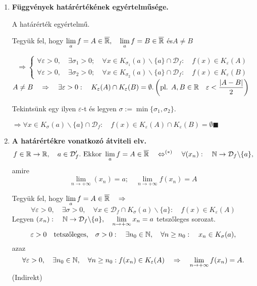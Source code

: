 \documentclass[a4paper,11.5pt]{article}
\begin{document}
\begin{enumerate}
		\item \textbf{Függvények határértékének egyértelműsége.}
		
		A határérték egyértelmű.
		
		\biz Tegyük fel, hogy $\displaystyle\lim_af=A\in\overline{\mathbb{R}}, \quad \lim_af=B\in \overline{\mathbb{R}}$ \quad és\quad  $A\not=B$
		
		\[\Rightarrow\left\{\begin{gathered}
		\forall \varepsilon>0, \quad \exists\sigma_1>0; \quad \forall x \in K_{\sigma_1}(a)\backslash\{a\}\cap \mathcal{D}_f:\quad f(x)\in K_{\varepsilon}(A)\\
		\forall \varepsilon>0, \quad \exists\sigma_2>0; \quad \forall x \in K_{\sigma_2}(a)\backslash\{a\}\cap \mathcal{D}_f:\quad f(x)\in K_{\varepsilon}(B)
		\end{gathered}\right.
		\]
		$\displaystyle A\not=B\quad \Rightarrow\quad \exists\varepsilon>0:\quad K_\varepsilon(A)\cap K_\varepsilon(B)=\emptyset. \left(\text{pl. }A,B \in \mathbb{R} \quad \varepsilon<\displaystyle\frac{|A-B|}{2}\right)$
		
		Tekintsünk egy ilyen $\varepsilon$-t és legyen $\sigma:=\min\{\sigma_1,\sigma_2\}.$
		
		$\Rightarrow \forall x \in K_\sigma(a)\backslash\{a\}\cap\mathcal{D}_f:\quad f(x)\in K_\varepsilon(A)\cap K_\varepsilon(B)=\emptyset$\quad  {\LARGE\Lightning}\quad $\blacksquare$
		
		\item \textbf{A határértékre vonatkozó átviteli elv.}
		\[f\in\mathbb{R}\rightarrow\mathbb{R}, \quad a\in\mathcal{D}_f'.\text{ Ekkor }\lim_af=A\in\overline{\mathbb{R}}\quad \Leftrightarrow^{(*)}\quad \forall(x_n):\quad \mathbb{N}\to\mathcal{D}_f\backslash\{a\},\]
		amire
		\[\lim_{n\to+\infty}(x_n)=a;\quad \lim_{n\to+\infty}f(x_n)=A\]
		
		\biz \fbox{$\Rightarrow:$}
		
		Tegyük fel, hogy $\displaystyle\lim_af=A\in\overline{\mathbb{R}}\quad \Rightarrow$
		\[ \forall \varepsilon>0,\quad \exists \sigma>0,\quad \forall x \in \mathcal{D}_f\cap K_\sigma(a)\backslash\{a\}:\quad f(x)\in K_\varepsilon(A) \]
		Legyen $\displaystyle(x_n):\quad \mathbb{N}\to\mathcal{D}_f\backslash\{a\},\quad  \lim_{n\to+\infty}x_n=a$ \quad tetszőleges sorozat.
		\[\varepsilon>0 \quad \text{tetszőleges,}\quad \sigma>0:\quad \exists n_0\in\mathbb{N},\quad \forall n\geq n_0:\quad x_n\in K_\sigma(a),\]
		azaz \[\forall\varepsilon>0,\quad  \exists n_0\in\mathbb{N},\quad \forall n\geq n_0: f(x_n)\in K_\varepsilon(A)\quad \Rightarrow\quad \lim_{n\to+\infty}f(x_n)=A.\]
		\fbox{$\Leftarrow:$} (Indirekt)
		

\end{enumerate}
\end{document}
